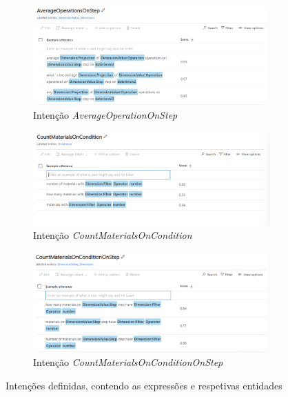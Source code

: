 \begin{figure}
\centering
    \begin{subfigure}{.9\textwidth}
        \centering
        \includegraphics[width=\textwidth]{appendices/assets/kb01.png}
        \caption{Intenção \textit{AverageOperationOnStep}}
     \end{subfigure}
     \begin{subfigure}{.9\textwidth}
         \centering
        \includegraphics[width=\textwidth]{appendices/assets/kb02.png}
        \caption{Intenção \textit{CountMaterialsOnCondition}}
     \end{subfigure}
     \begin{subfigure}{.9\textwidth}
        \centering
        \includegraphics[width=\textwidth]{appendices/assets/kb03.png}
        \caption{Intenção \textit{CountMaterialsOnConditionOnStep}}
     \end{subfigure}
\caption{Intenções definidas, contendo as expressões e respetivas entidades}
\end{figure}
